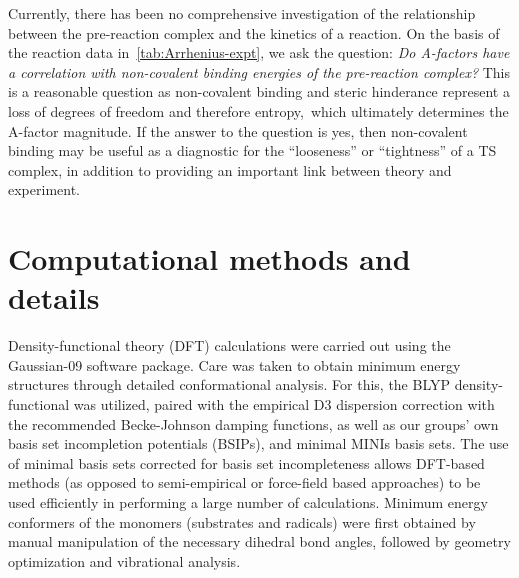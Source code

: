 Currently, there has been no comprehensive investigation of the relationship
between the pre-reaction complex and the kinetics of a reaction. On the basis
of the reaction data in~\ref{tab:Arrhenius-expt}, we ask the question: \emph{Do
A-factors have a correlation with non-covalent binding energies of the
pre-reaction complex?} This is a reasonable question as non-covalent binding
and steric hinderance represent a loss of degrees of freedom and therefore
entropy,\footnotemark\ which ultimately determines the A-factor magnitude. If
the answer to the question is yes, then non-covalent binding may be useful as a
diagnostic for the ``looseness'' or ``tightness'' of a TS complex, in addition
to providing an important link between theory and experiment.


\section{Computational methods and details}

Density-functional theory (DFT) calculations were carried out using the
Gaussian-09 software package.\cite{Frisch2009} Care was taken to obtain minimum
energy structures through detailed conformational analysis. For this, the BLYP
density-functional\cite{Becke1988,Lee1988} was utilized, paired with the
empirical D3 dispersion correction\cite{Grimme2010} with the recommended
Becke-Johnson damping functions,\cite{Johnson2006} as well as our groups' own
basis set incompletion potentials (BSIPs),\cite{OterodelaRoza2017ACP} and
minimal MINIs basis sets.\cite{Huzinaga1984} The use of minimal basis sets
corrected for basis set incompleteness allows DFT-based methods (as opposed to
semi-empirical or force-field based approaches) to be used efficiently in
performing a large number of calculations. Minimum energy conformers of the
monomers (substrates and radicals) were first obtained by manual manipulation
of the necessary dihedral bond angles, followed by geometry optimization and
vibrational analysis.

